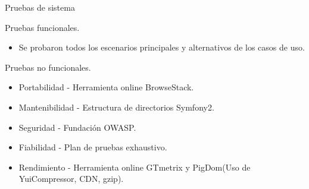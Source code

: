 \documentclass[spanish,xcolor=table,svgnames]{beamer}
\begin{document}
\begin{frame}{Pruebas de sistema}
  \begin{block}{Pruebas funcionales.}
\begin{itemize}
 \item Se probaron todos los escenarios principales y alternativos de los casos de uso.
\end{itemize}
  \end{block}\pause

  \begin{block}{Pruebas no funcionales.}
	\begin{itemize}
\item Portabilidad - Herramienta online BrowseStack.
\item Mantenibilidad - Estructura de directorios Symfony2.
\item Seguridad - Fundación OWASP.
\item Fiabilidad - Plan de pruebas exhaustivo.
\item Rendimiento - Herramienta online GTmetrix y PigDom(Uso de YuiCompressor, CDN, gzip).
\end{itemize}
  \end{block}
\end{frame}
\end{document}
